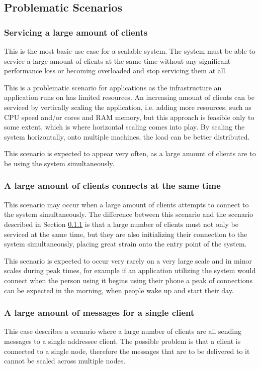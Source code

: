 \subsection{Problematic Scenarios} \label{analysis-scale}
\subsubsection{Servicing a large amount of clients} \label{analysis-scale-large-no}
This is the most basic use case for a scalable system. The system must be able to service a large amount of clients at the same time without any significant performance loss or becoming overloaded and stop servicing them at all.

This is a problematic scenario for applications as the infrastructure an application runs on has limited resources. An increasing amount of clients can be serviced by vertically scaling the application, i.e. adding more resources, such as CPU speed and/or cores and RAM memory, but this approach is feasible only to some extent, which is where horizontal scaling comes into play. By scaling the system horizontally, onto multiple machines, the load can be better distributed.

This scenario is expected to appear very often, as a large amount of clients are to be using the system simultaneously.

\subsubsection{A large amount of clients connects at the same time}
This scenario may occur when a large amount of clients attempts to connect to the system simultaneously. The difference between this scenario and the scenario described in Section \ref{analysis-scale-large-no}  is that a large number of clients must not only be serviced at the same time, but they are also initializing their connection to the system simultaneously, placing great strain onto the entry point of the system.

This scenario is expected to occur very rarely on a very large scale and in minor scales during peak times, for example if an application utilizing the system would connect when the person using it begins using their phone a peak of connections can be expected in the morning, when people wake up and start their day.

\subsubsection{A large amount of messages for a single client}
This case describes a scenario where a large number of clients are all sending messages to a single addressee client. The possible problem is that a client is connected to a single node, therefore the messages that are to be delivered to it cannot be scaled across multiple nodes.

